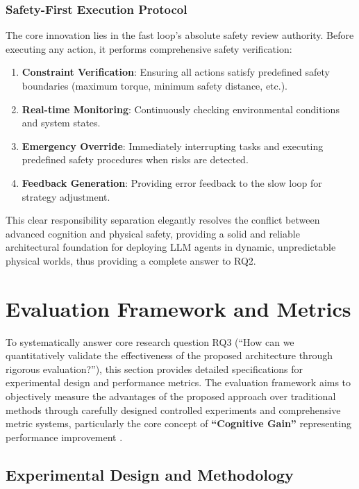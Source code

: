 \subsubsection{Safety-First Execution Protocol}

The core innovation lies in the fast loop's absolute safety review authority. Before executing any action, it performs comprehensive safety verification:

\begin{enumerate}
\item \textbf{Constraint Verification}: Ensuring all actions satisfy predefined safety boundaries (maximum torque, minimum safety distance, etc.).
\item \textbf{Real-time Monitoring}: Continuously checking environmental conditions and system states.
\item \textbf{Emergency Override}: Immediately interrupting tasks and executing predefined safety procedures when risks are detected.
\item \textbf{Feedback Generation}: Providing error feedback to the slow loop for strategy adjustment.
\end{enumerate}

This clear responsibility separation elegantly resolves the conflict between advanced cognition and physical safety, providing a solid and reliable architectural foundation for deploying LLM agents in dynamic, unpredictable physical worlds, thus providing a complete answer to RQ2.

\section{Evaluation Framework and Metrics}

To systematically answer core research question RQ3 (``How can we quantitatively validate the effectiveness of the proposed architecture through rigorous evaluation?''), this section provides detailed specifications for experimental design and performance metrics. The evaluation framework aims to objectively measure the advantages of the proposed approach over traditional methods through carefully designed controlled experiments and comprehensive metric systems, particularly the core concept of \textbf{``Cognitive Gain''} representing performance improvement \cite{stone2016artificial}.

\subsection{Experimental Design and Methodology}

